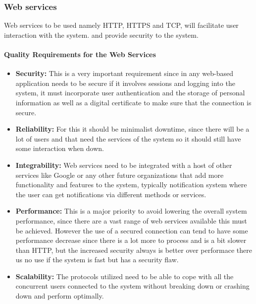 \documentclass[a4paper]{article}
\begin{document}
	
	\subsubsection{Web services}
	Web services to be used namely HTTP, HTTPS and TCP, will facilitate user interaction with the system. and provide security to the system. 
	\paragraph{Quality Requirements for the Web Services}
	\begin{itemize}
		\item{\textbf{Security:} This is a very important requirement since in any web-based application needs to be secure if it involves sessions and logging into the system, it must incorporate user authentication and the storage of personal information as well as a digital certificate to make sure that the connection is secure.}
		\item{\textbf{Reliability:} For this it should be minimalist downtime, since there will be a lot of users and that need the services of the system so it should still have some interaction when down. }
		\item{\textbf{Integrability:} Web services need to be integrated with a host of other services like Google or any other future organizations that add more functionality and features to the system, typically notification system where the user can get notifications via different methods or services.}
		\item{\textbf{Performance:} This is a major priority to avoid lowering the overall system performance, since there are a vast range of web services available this must be achieved. However the use of a secured connection can tend to have some performance decrease since there is a lot more to process and is a bit slower than HTTP, but the increased security always is better over performace there us no use if the system is fast but has a security flaw.}
		\item{\textbf{Scalability:} The protocols utilized need to be able to cope with all the concurrent users connected to the system without breaking down or crashing down and perform optimally.}
	\end{itemize}
	
\end{document}
